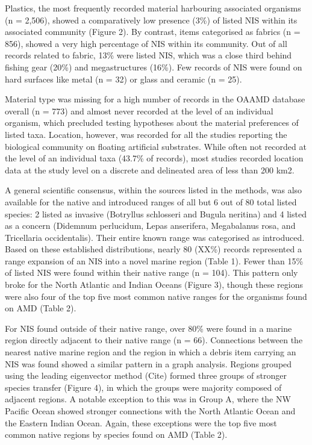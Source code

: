 \documentclass[a4paper, nobind]{templates/ociamthesis}
\begin{document}
Plastics, the most frequently recorded material harbouring associated organisms (n = 2,506), showed a comparatively low presence (3\%) of listed NIS within its associated community (Figure 2). By contrast, items categorised as fabrics (n = 856), showed a very high percentage of NIS within its community. Out of all records related to fabric, 13\% were listed NIS, which was a close third behind fishing gear (20\%) and megastructures (16\%). Few records of NIS were found on hard surfaces like metal (n = 32) or glass and ceramic (n = 25).

Material type was missing for a high number of records in the OAAMD database overall (n = 773) and almost never recorded at the level of an individual organism, which precluded testing hypotheses about the material preferences of listed taxa. Location, however, was recorded for all the studies reporting the biological community on floating artificial substrates. While often not recorded at the level of an individual taxa (43.7\% of records), most studies recorded location data at the study level on a discrete and delineated area of less than 200 km2.

A general scientific consensus, within the sources listed in the methods, was also available for the native and introduced ranges of all but 6 out of 80 total listed species: 2 listed as invasive (Botryllus schlosseri and Bugula neritina) and 4 listed as a concern (Didemnum perlucidum, Lepas anserifera, Megabalanus rosa, and Tricellaria occidentalis). Their entire known range was categorised as introduced. Based on these established distributions, nearly 80 (XX\%) records represented a range expansion of an NIS into a novel marine region (Table 1). Fewer than 15\% of listed NIS were found within their native range (n = 104). This pattern only broke for the North Atlantic and Indian Oceans (Figure 3), though these regions were also four of the top five most common native ranges for the organisms found on AMD (Table 2).

For NIS found outside of their native range, over 80\% were found in a marine region directly adjacent to their native range (n = 66). Connections between the nearest native marine region and the region in which a debris item carrying an NIS was found showed a similar pattern in a graph analysis. Regions grouped using the leading eigenvector method (Cite) formed three groups of stronger species transfer (Figure 4), in which the groups were majority composed of adjacent regions. A notable exception to this was in Group A, where the NW Pacific Ocean showed stronger connections with the North Atlantic Ocean and the Eastern Indian Ocean. Again, these exceptions were the top five most common native regions by species found on AMD (Table 2).
\end{document}

